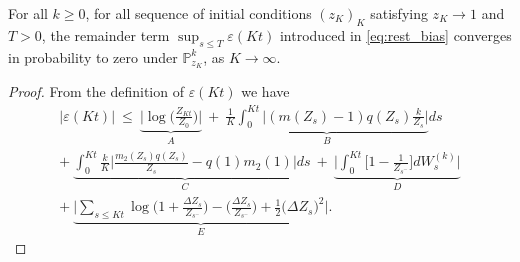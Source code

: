 \begin{refsegment}
\begin{lem}\label{lem:rest_bias}
   For all $k\geqslant 0$, for all sequence of initial conditions $(z_K)_K$ satisfying $z_K\to 1$ and $T>0$, the remainder term $\sup_{s\leqslant T}\varepsilon(Kt)$ introduced in \eqref{eq:rest_bias} converges in probability to zero under $\mathbb{P}^k_{z_K}$, as $K\to\infty$.
\end{lem}

\begin{proof}
From the definition of $\varepsilon(Kt)$ we have
\begin{multline*}
    \big|\varepsilon(Kt)\big|\ \leqslant \ \underbrace{  \Big| \log \Big(\frac{{Z}_{Kt}}{{Z}_0}\Big)\Big|}_{A} \ +\ \underbrace{\frac{1}{K} \int_0^{Kt} \Big|({m}({Z}_s)-1)q({Z}_s)\frac{ k }{{Z}_s }\Big|}_{B}ds\\
      +\ \underbrace{\int_0^{Kt}\frac{k }{K}\Big|\frac{{m}_2({Z}_s)q({Z}_s)}{{Z}_s}-q(1)m_2(1)\Big|}_{C} ds\ +\ \underbrace{\Big|\int_0^{Kt}\Big[1-\frac{1}{{Z}_{s^-}}\Big] dW^{(k)}_s\Big|}_{D}\\
     +\ \underbrace{\Big|\sum_{s\leqslant Kt} \log\Big(1+\frac{\Delta {Z}_{s}}{Z_{s^-}}\Big)-\Big(\frac{\Delta {Z}_{s}}{{Z}_{s^-}}\Big)+\frac{1}{2}\big(\Delta {Z}_{s}\big)^2\Big|}_{E}.
\end{multline*}


\end{proof}
\end{refsegment}
